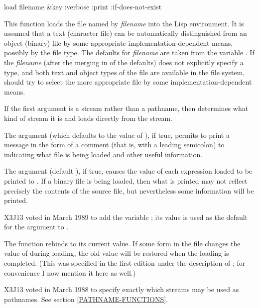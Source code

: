 \begin{defun}[Function]
load filename &key :verbose :print :if-does-not-exist

This function loads the file named by \emph{filename} into the Lisp
environment.  It is assumed that a text (character file) can be
automatically distinguished from an object (binary) file by some appropriate
implementation-dependent means, possibly by the file type.
The defaults for \emph{filename} are taken from the variable
.
If the \emph{filename} (after the merging in of the defaults)
does not explicitly specify a type,
and both text and object types of the file are available in the file system,
 should
try to select the more appropriate file by some implementation-dependent means.

If the first argument is a stream rather than a pathname,
then  determines what kind of stream it is and loads
directly from the stream.

The  argument (which defaults to the value of
), if true, permits  to print a message
in the form of a comment (that is, with a leading
semicolon) to  indicating what
file is being loaded and other useful information.

\begin{obsolete}
The  argument (default {\nil}),
if true, causes the value of each expression
loaded to be printed to .  If a binary file is
being loaded, then what is printed may not reflect precisely the contents
of the source file, but nevertheless some information will be printed.
\end{obsolete}
\begin{newer}
X3J13 voted in March 1989 
to add the variable ; its value is used as the default
for the  argument to .
\end{newer}

\begin{newer}
The function  rebinds  to its current value.  If
some form in the file changes the value of  during loading,
the old value will be restored when the loading is completed.
(This was specified in the first edition under the description of ;
for convenience I now mention it here as well.)
\end{newer}

\begin{new}
X3J13 voted in March 1988
to specify exactly which streams may be used as pathnames.
See section \ref{PATHNAME-FUNCTIONS}.
\end{new}


\end{defun}
